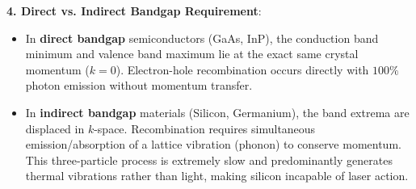\begin{theorysol}
\textbf{4. Direct vs. Indirect Bandgap Requirement}:
\begin{itemize}
    \item In \textbf{direct bandgap} semiconductors (GaAs, InP), the conduction band minimum and valence band maximum lie at the exact same crystal momentum ($k = 0$). Electron-hole recombination occurs directly with $100\%$ photon emission without momentum transfer.
    \item In \textbf{indirect bandgap} materials (Silicon, Germanium), the band extrema are displaced in $k$-space. Recombination requires simultaneous emission/absorption of a lattice vibration (phonon) to conserve momentum. This three-particle process is extremely slow and predominantly generates thermal vibrations rather than light, making silicon incapable of laser action.
\end{itemize}
\end{theorysol}
\vspace{4mm}


